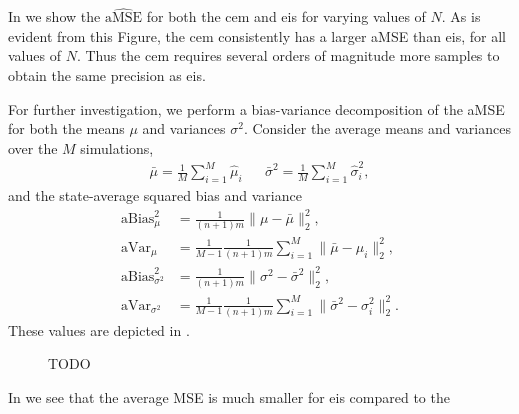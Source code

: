
In  we show the $\widehat{\text{aMSE}}$ for both the \gls{cem} and \gls{eis} for varying values of $N$. As is evident from this Figure, the \gls{cem} consistently has a larger aMSE than \gls{eis}, for all values of $N$. Thus the \gls{cem} requires several orders of magnitude more samples to obtain the same precision as \gls{eis}.

For further investigation, we perform a bias-variance decomposition of the aMSE for both the means $\mu$ and variances $\sigma^{2}$. Consider the average means and variances over the $M$ simulations,
\begin{align*}
    \bar \mu = \frac{1}{M} \sum_{i=1}^{M} \hat\mu_{i} && \bar \sigma^{2} = \frac{1}{M} \sum_{i=1}^{M} \hat\sigma^{2}_{i},
\end{align*}
and the state-average squared bias and variance
\begin{align*}
    \text{aBias}^{2}_{\mu} &= \frac{1}{(n+1)m} \lVert \mu - \bar\mu \rVert^{2}_{2}, \\
    \text{aVar}_{\mu} &= \frac{1}{M - 1}\frac{1}{(n+1)m} \sum_{i=1}^M \lVert \bar\mu - \mu_{i} \rVert^{2}_{2},\\
    \text{aBias}^{2}_{\sigma^{2}} &= \frac{1}{(n+1)m} \lVert \sigma^{2} - \bar\sigma^{2} \rVert^{2}_{2}, \\
    \text{aVar}_{\sigma^{2}} &= \frac{1}{M - 1}\frac{1}{(n+1)m} \sum_{i=1}^M \lVert \bar\sigma^{2} - \sigma^{2}_{i} \rVert^{2}_{2}.
\end{align*}
These values are depicted in . 
\begin{figure}
    \resizebox{\textwidth}{!}{%
        
    }
    \caption{{\color{red} TODO}}
    \label{fig:mse_bias_var_decomposition}
\end{figure}

In  we see that the average MSE is much smaller for \acrshort{eis} compared to the 
